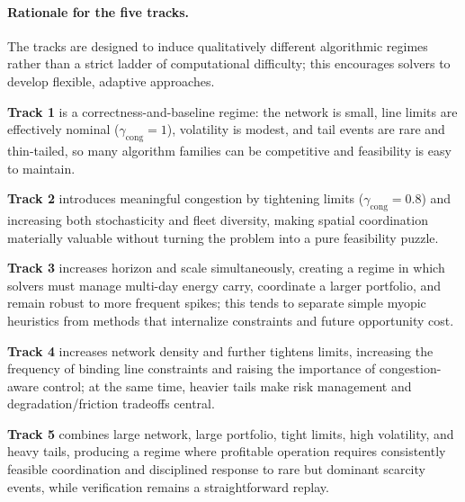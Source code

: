\documentclass[11pt]{article}
\begin{document}
\paragraph{Rationale for the five tracks.}
The tracks are designed to induce qualitatively different algorithmic regimes rather than a strict ladder of computational difficulty; this encourages solvers to develop flexible, adaptive approaches.

\textbf{Track 1} is a correctness-and-baseline regime: the network is small, line limits are effectively nominal ($\gamma_{\mathrm{cong}}=1$), volatility is modest, and tail events are rare and thin-tailed, so many algorithm families can be competitive and feasibility is easy to maintain.

\textbf{Track 2} introduces meaningful congestion by tightening limits ($\gamma_{\mathrm{cong}}=0.8$) and increasing both stochasticity and fleet diversity, making spatial coordination materially valuable without turning the problem into a pure feasibility puzzle.

\textbf{Track 3} increases horizon and scale simultaneously, creating a regime in which solvers must manage multi-day energy carry, coordinate a larger portfolio, and remain robust to more frequent spikes; this tends to separate simple myopic heuristics from methods that internalize constraints and future opportunity cost.

\textbf{Track 4} increases network density and further tightens limits, increasing the frequency of binding line constraints and raising the importance of congestion-aware control; at the same time, heavier tails make risk management and degradation/friction tradeoffs central.

\textbf{Track 5} combines large network, large portfolio, tight limits, high volatility, and heavy tails, producing a regime where profitable operation requires consistently feasible coordination and disciplined response to rare but dominant scarcity events, while verification remains a straightforward replay.
\end{document}
